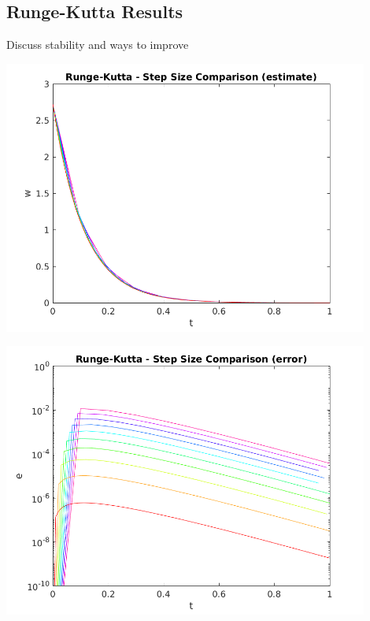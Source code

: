 \documentclass{article}
\begin{document}
\subsection{Runge-Kutta Results}
\label{results:rk}

Discuss stability and ways to improve

\begin{center}
  \includegraphics[width=0.9\textwidth]{../output/a_rk_h_val.png}
  \label{fig:a_rk_h_val}
\end{center}

\begin{center}
  \includegraphics[width=0.9\textwidth]{../output/a_rk_h_err.png}
  \label{fig:a_rk_h_err}
\end{center}
\end{document}
